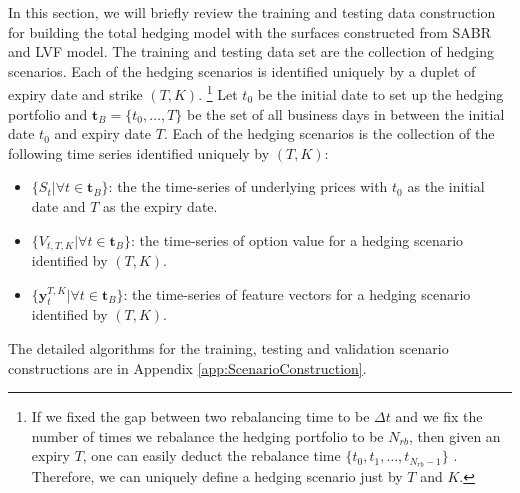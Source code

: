 \documentclass[letterpaper,12pt,titlepage,oneside,final]{book}
\numberwithin{equation}{section}
\theoremstyle{definition}
\newcommand{\vy}{\mathbf{y}}
\newcommand{\DT}{\Delta t}
\begin{document}
In this section, we will briefly review the training and testing data construction for building the total hedging model with the surfaces constructed from SABR and LVF model. The training and testing data set are the collection of hedging scenarios. Each of the hedging scenarios is identified uniquely by a duplet of expiry date and strike  $(T,K)$. \footnote{ If we fixed the gap between two rebalancing time to be $\DT$ and we fix the number of times we rebalance the hedging portfolio to be $N_{rb}$, then given an expiry $T$, one can easily deduct the rebalance time $\{t_0,t_1, \dots, t_{N_{rb}-1}\}$ . Therefore, we can uniquely define a hedging scenario just by $T$ and $K$.} Let $t_0$ be the initial date to set up the hedging portfolio and $\mathbf{t}_B=\{t_0,\dots,T\}$ be the set of all business days in between the initial date $t_0$ and expiry date $T$.  Each of the hedging scenarios is the collection of the following time series identified uniquely by $(T,K)$:
\begin{itemize}
	\item $\{S_t|\forall t \in \mathbf{t}_B \}$: the the time-series of underlying prices  with $t_0$ as the initial date and $T$ as the expiry date.
	\item $\{V_{t,T,K}|\forall t \in \mathbf{t}_B\}$:  the time-series of option value for a hedging scenario identified by $(T,K)$.
	\item $\{\vy^{T,K}_{t}|\forall t \in \mathbf{t}_B\}$: the time-series of feature vectors for a hedging scenario identified by $(T,K)$.
\end{itemize}
The detailed algorithms for the training, testing and validation scenario constructions are in Appendix \ref{app:ScenarioConstruction}. 
\end{document}
